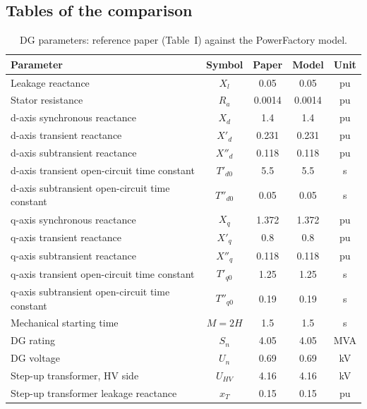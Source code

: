 \documentclass[12pt,a4paper]{article}
\newcommand{\PF}{PowerFactory}
\begin{document}
\subsection*{Tables of the comparison}
\begin{table}[H]
\centering\small
\begin{tabular}{|l|c|c|c|c|}
\hline
\textbf{Parameter} & \textbf{Symbol} & \textbf{Paper} & \textbf{Model} & \textbf{Unit} \\ \hline
Leakage reactance & $X_l$ & 0.05 & 0.05 & pu \\ \hline
Stator resistance & $R_a$ & 0.0014 & 0.0014 & pu \\ \hline
d-axis synchronous reactance & $X_d$ & 1.4 & 1.4 & pu \\ \hline
d-axis transient reactance & $X'_d$ & 0.231 & 0.231 & pu \\ \hline
d-axis subtransient reactance & $X''_d$ & 0.118 & 0.118 & pu \\ \hline
d-axis transient open-circuit time constant & $T'_{d0}$ & 5.5 & 5.5 & s \\ \hline
d-axis subtransient open-circuit time constant & $T''_{d0}$ & 0.05 & 0.05 & s \\ \hline
q-axis synchronous reactance & $X_q$ & 1.372 & 1.372 & pu \\ \hline
q-axis transient reactance & $X'_q$ & 0.8 & 0.8 & pu \\ \hline
q-axis subtransient reactance & $X''_q$ & 0.118 & 0.118 & pu \\ \hline
q-axis transient open-circuit time constant & $T'_{q0}$ & 1.25 & 1.25 & s \\ \hline
q-axis subtransient open-circuit time constant & $T''_{q0}$ & 0.19 & 0.19 & s \\ \hline
Mechanical starting time & $M = 2H$ & 1.5 & 1.5 & s \\ \hline
DG rating & $S_n$ & 4.05 & 4.05 & MVA \\ \hline
DG voltage & $U_n$ & 0.69 & 0.69 & kV \\ \hline
Step-up transformer, HV side & $U_{HV}$ & 4.16 & 4.16 & kV \\ \hline
Step-up transformer leakage reactance & $x_T$ & 0.15 & 0.15 & pu \\ \hline
\end{tabular}
\caption{DG parameters: reference paper (Table~I) against the \PF{} model.}
\label{tab:e1}
\end{table}
\end{document}
